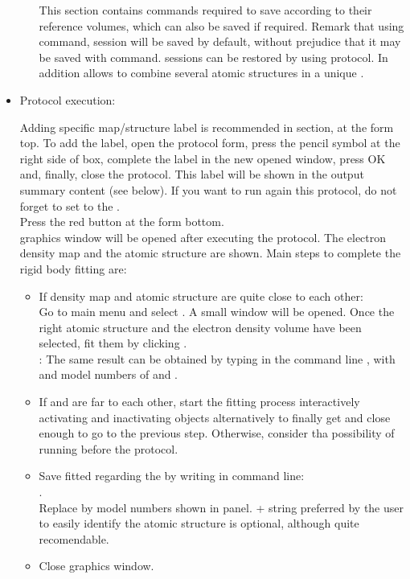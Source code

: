 \begin{itemize}
\begin{itemize}
    This section contains \chimera commands required to save  according to their reference volumes, which can also be saved if required. Remark that using  command, \chimera session will be saved by default, without prejudice that it may be saved with  command. \chimera sessions can be restored by using  protocol. In addition  allows to combine several atomic structures in a unique .
    
    \end{itemize}

  \item Protocol execution:
  
  Adding specific map/structure label is recommended in  section, at the form top. To add the label, open the protocol form, press the pencil symbol at the right side of  box, complete the label in the new opened window, press OK and, finally, close the protocol. This label will be shown in the output summary content (see below). If you want to run again this protocol, do not forget to set to  the .\\
  Press the  red button at the form bottom.\\
  
  \chimera graphics window will be opened after executing the protocol. The electron density map and the atomic structure are shown. Main steps to complete the rigid body fitting are:
  \begin{itemize}
   \item If density map and atomic structure are quite close to each other:\\Go to \chimera main menu and select . A small  window will be opened. Once the right atomic structure and the electron density volume have been selected, fit them by clicking .\\
   : The same result can be obtained by typing in the command line , with  and  \chimera model numbers of  and .
   \item If  and  are far to each other, start the fitting process interactively activating and inactivating \chimera objects alternatively to finally get  and  close enough to go to the previous step. Otherwise, consider tha possibility of running before the \phenix {} protocol.
   \item Save fitted  regarding the  by writing in \chimera command line:\\ .\\Replace {} by model numbers shown in \chimera {} panel.  + string preferred by the user to easily identify the atomic structure is optional, although quite recomendable.
   \item Close \chimera graphics window.
  \end{itemize}
  

\end{itemize}
